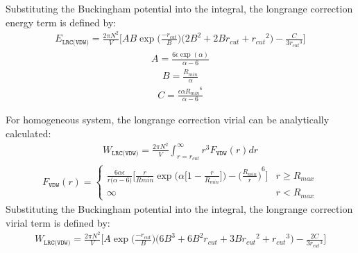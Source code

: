 \documentclass[letterpaper,10pt,english]{sphinxmanual}
\begin{document}
\begin{description}
\sphinxAtStartPar
Substituting the Buckingham potential into the integral, the long\sphinxhyphen{}range correction energy term is defined by:
\begin{equation*}
\begin{split}E_{\texttt{LRC(VDW)}} = \frac{2\pi N^2}{V} \bigg[AB \exp\big(\frac{-r_{cut}}{B}\big) \bigg(2 B^2 + 2 B r_{cut} + {r_{cut}}^2 \bigg) - \frac{C}{3 {r_{cut}}^3}   \bigg]\end{split}
\end{equation*}\begin{equation*}
\begin{split}A = \frac{6 \epsilon \exp(\alpha)}{\alpha - 6}\end{split}
\end{equation*}\begin{equation*}
\begin{split}B = \frac{R_{min}}{\alpha}\end{split}
\end{equation*}\begin{equation*}
\begin{split}C = \frac{\epsilon \alpha {R_{min}}^6}{\alpha - 6}\end{split}
\end{equation*}
\item[{\sphinxcode{\sphinxupquote{Virial}}}] \leavevmode
\sphinxAtStartPar
For homogeneous system, the long\sphinxhyphen{}range correction virial can be analytically calculated:
\begin{equation*}
\begin{split}W_{\texttt{LRC(VDW)}} = \frac{2\pi N^2}{V} \int_{r=r_{cut}}^{\infty} r^3 F_{\texttt{VDW}}(r) dr\end{split}
\end{equation*}\begin{equation*}
\begin{split}F_{\texttt{VDW}}(r) =
\begin{cases}
  \frac{6 \alpha\epsilon}{r\big(\alpha-6\big)} \bigg[\frac{r}{R{min}} \exp\bigg(\alpha \bigg[1-\frac{r}{R_{min}} \bigg]\bigg) - {\bigg(\frac{R_{min}}{r}\bigg)}^6 \bigg] &  r \geq R_{max} \\
  \infty & r < R_{max}
\end{cases}\end{split}
\end{equation*}
\sphinxAtStartPar
Substituting the Buckingham potential into the integral, the long\sphinxhyphen{}range correction virial term is defined by:
\begin{equation*}
\begin{split}W_{\texttt{LRC(VDW)}} = \frac{2\pi N^2}{V} \bigg[A \exp\big(\frac{-r_{cut}}{B}\big) \bigg(6 B^3 + 6 B^2 r_{cut} + 3 B {r_{cut}}^2 + {r_{cut}}^3 \bigg) - \frac{2C}{3 {r_{cut}}^3}   \bigg]\end{split}
\end{equation*}
\end{description}
\end{document}
